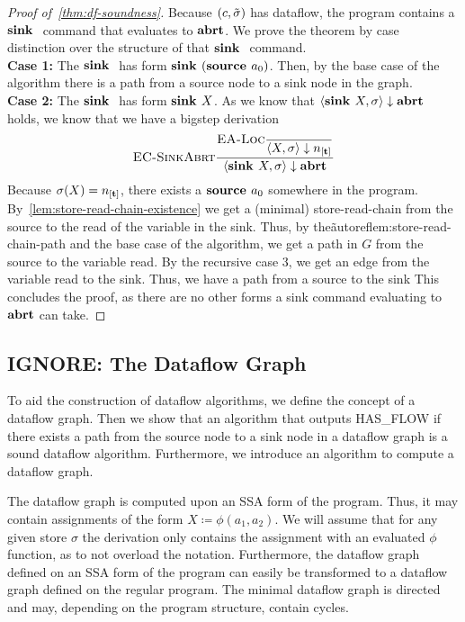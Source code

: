 \begin{proof}[Proof of~\autoref{thm:df-soundness}]
    Because $(c, \tilde{\sigma}{})$ has dataflow, the program contains a $\textbf{sink }{}$
    command that evaluates to $\textbf{abrt}$.
    We prove the theorem by case distinction over the structure of that $\textbf{sink }{}$
    command.\\
    \textbf{Case 1:}
    The $\textbf{sink }{}$ has form $\textbf{sink }{(\textbf{source }{ a_0})}$.
    Then, by the base case of the algorithm there is a path from a source node
    to a sink node in the graph.\\
    \textbf{Case 2:}
    The $\textbf{sink }{}$ has form $\textbf{sink }{X}$.
    As we know that $\langle \textbf{sink }{X}, \sigma \rangle \downarrow \textbf{abrt}$ holds, we know that
    we have a bigstep derivation
    \begin{align*}
        \bsrule{EC-SinkAbrt}
        {\bsrule{EA-Loc}{}{\bigstep{X}{\sigma}{\tracked{}}}}
        {\bigstep{\sink{X}}{\sigma}{\exception}}
    \end{align*}
    Because $\sigma(X) = \tracked{}$, there exists a $\textbf{source }{a_0}$ somewhere in the program.
    By~\autoref{lem:store-read-chain-existence} we get a (minimal) store-read-chain from the source 
    to the read of the variable in the sink.
    Thus, by the\~autoref{lem:store-read-chain-path} and the base case of the algorithm, 
    we get a path in $G$ from the source to the variable read.
    By the recursive case 3, we get an edge from the variable read to the sink.
    Thus, we have a path from a source to the sink
    This concludes the proof, as there are no other forms a sink command evaluating 
    to $\textbf{abrt}$ can take.
\end{proof}
\fi
\iffalse
\subsection{IGNORE: The Dataflow Graph}
To aid the construction of dataflow algorithms, we define the concept
of a dataflow graph.
Then we show that an algorithm that outputs HAS\_FLOW if 
there exists a path from the source 
node to a sink node in a dataflow graph %
is a sound dataflow algorithm.
Furthermore, we introduce an algorithm to compute a dataflow graph.

The dataflow graph is computed upon an SSA form of the program.
Thus, it may contain assignments of the form $X \coloneqq \phi(a_1, a_2)$.
We will assume that for any given store $\sigma$ the derivation only contains 
the assignment with an evaluated $\phi$ function, as to not overload the notation.
Furthermore, the dataflow graph defined on an SSA form of the program can easily 
be transformed to a dataflow graph defined on the regular program.
The minimal dataflow graph is directed and may, depending on the 
program structure, contain cycles.

